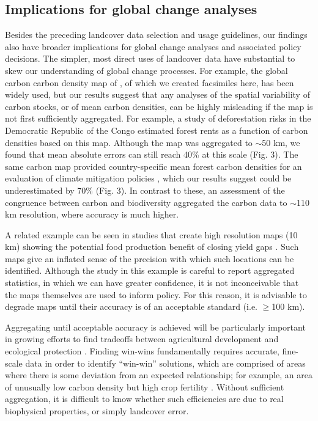 \documentclass{pnastwo}
\begin{document}
\begin{article}
\subsection{Implications for global change analyses}
Besides the preceding landcover data selection and usage guidelines, our findings also have broader implications for global change analyses and associated policy decisions. The simpler, most direct uses of landcover data have substantial to skew our understanding of global change processes. For example, the global carbon carbon density map of \cite{ruesch_new_2008}, of which we created facsimiles here, has been widely used, but our results suggest that any analyses of the spatial variability of carbon stocks, or of mean carbon densities, can be highly misleading if the map is not first sufficiently aggregated. For example, a study of deforestation risks in the Democratic Republic of the Congo estimated forest rents as a function of carbon densities based on this map. Although the map was aggregated to $\sim$50 km, we found that mean absolute errors can still reach 40\% at this scale (Fig. 3). The same carbon map provided country-specific mean forest carbon densities for an evaluation of climate mitigation policies \cite{cattaneo_international_2010}, which our results suggest could be underestimated by 70\% (Fig. 3). In contrast to these, an assessment of the congruence between carbon and biodiversity \cite{strassburg_global_2010} aggregated the carbon data to $\sim$110 km resolution, where accuracy is much higher. 

A related example can be seen in studies that create high resolution maps (10 km) showing the potential food production benefit of closing yield gaps \cite[e.g. Figure 3 in][]{foley_solutions_2011}. Such maps give an inflated sense of the precision with which such locations can be identified. Although the study in this example is careful to report aggregated statistics, in which we can have greater confidence, it is not inconceivable that the maps themselves are used to inform policy. For this reason, it is advisable to degrade maps until their accuracy is of an acceptable standard (i.e. $\geq$100 km). 

Aggregating until acceptable accuracy is achieved will be particularly important in growing efforts to find tradeoffs between agricultural development and ecological protection \cite[e.g.][]{searchinger_high_2015,west_trading_2010}. Finding win-wins fundamentally requires accurate, fine-scale data in order to identify ``win-win'' solutions, which are comprised of areas where there is some deviation from an expected relationship; for example, an area of unusually low carbon density but high crop fertility \cite{searchinger_high_2015}. Without sufficient aggregation, it is difficult to know whether such efficiencies are due to real biophysical properties, or simply landcover error. 


\end{article}
\end{document}
